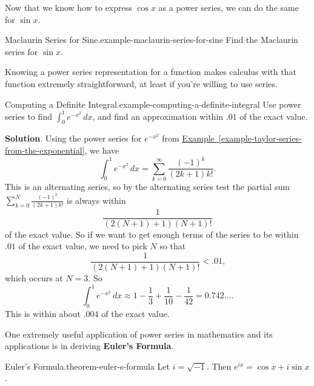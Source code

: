 \documentclass[10pt,]{book}
\newcommand{\terminology}[1]{\textbf{#1}}
\numberwithin{equation}{section}
\newcommand{\lt}{<}
\begin{document}
\hypertarget{p-975}{}%
Now that we know how to express \(\cos x\) as a power series, we can do the same for \(\sin x\).%
\begin{example}{Maclaurin Series for Sine.}{example-maclaurin-series-for-sine}%
\hypertarget{p-976}{}%
Find the Maclaurin series for \(\sin x\).%
\end{example}
\hypertarget{p-977}{}%
Knowing a power series representation for a function makes calculus with that function extremely straightforward, at least if you're willing to use series.%
\begin{example}{Computing a Definite Integral.}{example-computing-a-definite-integral}%
\hypertarget{p-978}{}%
Use power series to find \(\displaystyle\int_{0}^{1}e^{-x^{2}}\,dx\), and find an approximation within \(.01\) of the exact value.%
\par\smallskip%
\noindent\textbf{Solution}.\hypertarget{solution-198}{}\quad%
\hypertarget{p-979}{}%
Using the power series for \(e^{-x^{2}}\) from \hyperref[example-taylor-series-from-the-exponential]{Example~\ref{example-taylor-series-from-the-exponential}}, we have%
\begin{equation*}
\int_{0}^{1}e^{-x^{2}}\,dx = \sum_{k=0}^{\infty}\frac{(-1)^{k}}{(2k+1)k!}\text{.}
\end{equation*}
This is an alternating series, so by the alternating series test the partial sum \(\displaystyle\sum_{k=0}^{N}\frac{(-1)^{k}}{(2k+1)k!}\) is always within%
\begin{equation*}
\frac{1}{(2(N+1)+1)(N+1)!}
\end{equation*}
of the exact value. So if we want to get enough terms of the series to be within \(.01\) of the exact value, we need to pick \(N\) so that%
\begin{equation*}
\frac{1}{(2(N+1)+1)(N+1)!} \lt .01\text{,}
\end{equation*}
which occurs at \(N = 3\). So%
\begin{equation*}
\int_{0}^{1}e^{-x^{2}}\,dx \approx 1 - \frac{1}{3} + \frac{1}{10} - \frac{1}{42} = 0.742...\text{.}
\end{equation*}
This is within about \(.004\) of the exact value.%
\end{example}
\hypertarget{p-980}{}%
One extremely useful application of power series in mathematics and its applications is in deriving \terminology{Euler's Formula}.%
\begin{theorem}{Euler's Formula.}{}{theorem-euler-s-formula}%
\hypertarget{p-981}{}%
Let \(i = \sqrt{-1}\). Then \(e^{ix} = \cos x + i\sin x\).%
\end{theorem}
\end{document}
